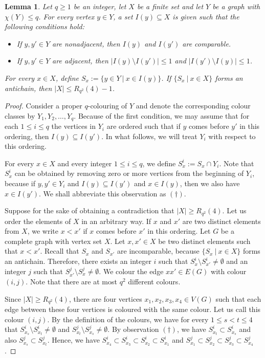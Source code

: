 \documentclass[10pt]{article}
\newtheorem{lemma}[thm]{Lemma}
\theoremstyle{definition}
\begin{document}
\begin{lemma}
\label{lem:RamseyCricket}
Let $q \geq 1$ be an integer, let $X$ be a finite set and let $Y$ be a graph with $\chi(Y) \leq q$. For every vertex $y \in Y$, a set $I(y) \subseteq X$ is given such that the following conditions hold:
\begin{itemize}
    \item If $y,y' \in Y$ are nonadjacent, then $I(y)$ and $I(y')$ are comparable.
    \item If $y,y' \in Y$ are adjacent, then $|I(y) \setminus I(y')| \leq 1$ and $|I(y') \setminus I(y)| \leq 1$.
\end{itemize}
For every $x \in X$, define $S_x := \{y \in Y~|~x \in I(y)\}$. If $\{S_x~|~x \in X\}$ forms an antichain, then $|X| \leq R_{q^2}(4)-1$.
\end{lemma}
\begin{proof}
Consider a proper $q$-colouring of $Y$ and denote the corresponding colour classes by $Y_1, Y_2, \ldots, Y_q$. Because of the first condition, we may assume that for each $1 \leq i \leq q$ the vertices in $Y_i$ are ordered such that if $y$ comes before $y'$ in this ordering, then $I(y) \subseteq I(y')$. In what follows, we will treat $Y_i$ with respect to this ordering.

For every $x \in X$ and every integer $1 \leq i \leq q$, we define $S_x^i := S_x \cap Y_i$. Note that $S_x^i$ can be obtained by removing zero or more vertices from the beginning of $Y_i$, because if $y,y' \in Y_i$ and $I(y)\subseteq I(y')$ and $x \in I(y)$, then we also have $x \in I(y')$. We shall abbreviate this observation as $(\dagger)$.

Suppose for the sake of obtaining a contradiction that $|X| \geq R_{q^2}(4)$. Let us order the elements of $X$ in an arbitrary way. If $x$ and $x'$ are two distinct elements from $X$, we write $x<x'$ if $x$ comes before $x'$ in this ordering. Let $G$ be a complete graph with vertex set $X$. Let $x, x' \in X$ be two distinct elements such that $x<x'$. Recall that $S_x$ and $S_{x'}$ are incomparable, because $\{S_x~|~x \in X\}$ forms an antichain. Therefore, there exists an integer $i$ such that $S_x^i \setminus S_{x'}^i \neq \emptyset$ and an integer $j$ such that $S_{x'}^j \setminus S_x^j \neq \emptyset$. We colour the edge $xx' \in E(G)$ with colour $(i,j)$. Note that there are at most $q^2$ different colours.

Since $|X| \geq R_{q^2}(4)$, there are four vertices $x_1, x_2, x_3, x_4 \in V(G)$ such that each edge between these four vertices is coloured with the same colour. Let us call this colour $(i,j)$. By the definition of the colours, we have for every $1 \leq s < t \leq 4$ that $S_{x_s}^i \setminus S_{x_t}^i \neq \emptyset$ and $S_{x_t}^j \setminus S_{x_s}^j \neq \emptyset$. By observation $(\dagger)$, we have $S_{x_t}^i \subset S_{x_s}^i$ and also $S_{x_s}^j \subset S_{x_t}^j$. Hence, we have $S_{x_4}^i \subset S_{x_3}^i \subset S_{x_2}^i \subset S_{x_1}^i$ and $S_{x_1}^j \subset S_{x_2}^j \subset S_{x_3}^j \subset S_{x_4}^j$.


\end{proof}
\end{document}
